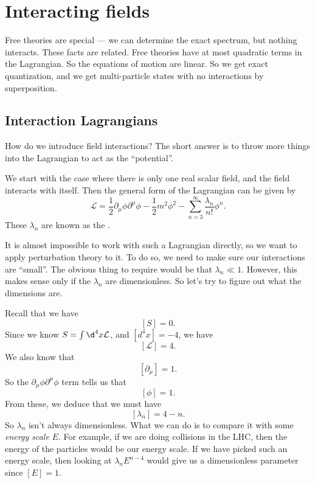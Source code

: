 \documentclass[a4paper]{article}
\begin{document}
\section{Interacting fields}
Free theories are special --- we can determine the exact spectrum, but nothing interacts. These facts are related. Free theories have at most quadratic terms in the Lagrangian. So the equations of motion are linear. So we get exact quantization, and we get multi-particle states with no interactions by superposition.

\subsection{Interaction Lagrangians}
How do we introduce field interactions? The short answer is to throw more things into the Lagrangian to act as the ``potential''.

We start with the case where there is only one real scalar field, and the field interacts with itself. Then the general form of the Lagrangian can be given by
\[
  \mathcal{L} = \frac{1}{2} \partial_\mu \phi \partial^\mu \phi - \frac{1}{2}m^2 \phi^2 - \sum_{n = 3}^\infty \frac{\lambda_n}{n!} \phi^n.
\]
These $\lambda_n$ are known as the .

It is almost impossible to work with such a Lagrangian directly, so we want to apply perturbation theory to it. To do so, we need to make sure our interactions are ``small''. The obvious thing to require would be that $\lambda_n \ll 1$. However, this makes sense only if the $\lambda_n$ are dimensionless. So let's try to figure out what the dimensions are.

Recall that we have
\[
  [S] = 0.
\]
Since we know $S = \int \d^4 x \mathcal{L}$, and $[d^4 x] = -4$, we have
\[
  [\mathcal{L}] = 4.
\]
We also know that
\[
  [\partial_\mu] = 1.
\]
So the $\partial_\mu \phi \partial^\mu \phi$ term tells us that
\[
  [\phi] = 1.
\]
From these, we deduce that we must have
\[
  [\lambda_n] = 4 - n.
\]
So $\lambda_n$ isn't always dimensionless. What we can do is to compare it with some \emph{energy scale} $E$. For example, if we are doing collisions in the LHC, then the energy of the particles would be our energy scale. If we have picked such an energy scale, then looking at $\lambda_n E^{n - 4}$ would give us a dimensionless parameter since $[E] = 1$.
\end{document}
